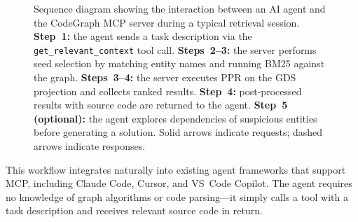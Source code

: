 \begin{figure}[H]
    \caption[Agent--MCP server interaction sequence]{Sequence diagram showing the interaction between an AI agent and the CodeGraph MCP server during a typical retrieval session. \textbf{Step~1:} the agent sends a task description via the \texttt{get\_relevant\_context} tool call. \textbf{Steps~2--3:} the server performs seed selection by matching entity names and running BM25 against the graph. \textbf{Steps~3--4:} the server executes PPR on the GDS projection and collects ranked results. \textbf{Step~4:} post-processed results with source code are returned to the agent. \textbf{Step~5 (optional):} the agent explores dependencies of suspicious entities before generating a solution. Solid arrows indicate requests; dashed arrows indicate responses.}
    \label{fig:agent-workflow}
\end{figure}

This workflow integrates naturally into existing agent frameworks that support MCP, including Claude Code, Cursor, and VS~Code Copilot. The agent requires no knowledge of graph algorithms or code parsing---it simply calls a tool with a task description and receives relevant source code in return.

